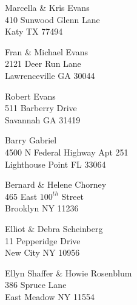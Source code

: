 \documentclass{article}
\begin{document}
\begin{center}
\begin{Huge}
\clearpage

\vspace*{\fill}
Marcella \& Kris Evans\\
410 Sunwood Glenn Lane\\
Katy TX 77494\\
\vspace{\fill}

\clearpage

\vspace*{\fill}
Fran \& Michael Evans\\
2121 Deer Run Lane\\
Lawrenceville GA 30044\\
\vspace{\fill}

\clearpage

\vspace*{\fill}
Robert Evans\\
511 Barberry Drive\\
Savannah GA 31419\\
\vspace{\fill}

\clearpage

\vspace*{\fill}
Barry Gabriel\\
4500 N Federal Highway Apt 251\\
Lighthouse Point FL 33064\\
\vspace{\fill}

\clearpage

\vspace*{\fill}
Bernard \& Helene Chorney\\
465 East $100^{th}$ Street\\
Brooklyn NY 11236\\
\vspace{\fill}

\clearpage

\vspace*{\fill}
Elliot \& Debra Scheinberg\\
11 Pepperidge Drive\\
New City NY  10956\\
\vspace{\fill}

\clearpage

\vspace*{\fill}
Ellyn Shaffer \& Howie Rosenblum\\
386 Spruce Lane\\
East Meadow NY 11554\\
\vspace{\fill}


\end{Huge}
\end{center}
\end{document}
